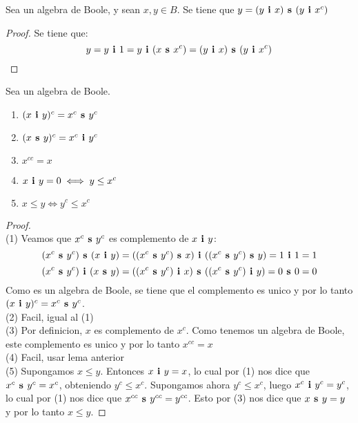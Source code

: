 \begin{lemma}
  Sea \algBoole un algebra de Boole, y sean $x, y \in B$. Se tiene que $y = (y\textbf{ i }x)\textbf{ s }(y\textbf{ i }x^c)$
\end{lemma}
\begin{proof}
  Se tiene que:
  $$
  y = y\textbf{ i }1 = y\textbf{ i }(x\textbf{ s }x^c) = (y\textbf{ i }x)\textbf{ s }(y\textbf{ i }x^c)
  $$
\end{proof}

\begin{theorem}
  Sea \algBoole un algebra de Boole.
  \begin{enumerate}
    \item $(x\textbf{ i }y)^c = x^c\textbf{ s }y^c$
    \item $(x\textbf{ s }y)^c = x^c\textbf{ i }y^c$
    \item $x^{cc} = x$
    \item $x\textbf{ i }y = 0 \iff y \leq x^c$
    \item $x\leq y \iff y^c \leq x^c$
  \end{enumerate}
\end{theorem}
\begin{proof}
  $ $\\
  (1) Veamos que $x^c\textbf{ s }y^c$ es complemento de $x\textbf{ i }y$:
  $$
  (x^c\textbf{ s }y^c)\textbf{ s }(x\textbf{ i }y) = ((x^c\textbf{ s }y^c)\textbf{ s }x)\textbf{ i }((x^c\textbf{ s }y^c)\textbf{ s }y) = 1\textbf{ i }1 = 1
  $$
  $$
  (x^c\textbf{ s }y^c)\textbf{ i }(x\textbf{ s }y) = ((x^c\textbf{ s }y^c)\textbf{ i }x)\textbf{ s }((x^c\textbf{ s }y^c)\textbf{ i }y) = 0\textbf{ s }0 = 0
  $$
  Como es un algebra de Boole, se tiene que el complemento es unico y por lo tanto $(x\textbf{ i }y)^c = x^c\textbf{ s }y^c$.\\
  (2) Facil, igual al (1)\\
  (3) Por definicion, $x$ es complemento de $x^c$. Como tenemos un algebra de Boole, este complemento es unico y por lo tanto $x^{cc} = x$\\
  (4) Facil, usar lema anterior\\
  (5) Supongamos $x \leq y$. Entonces $x\textbf{ i }y = x$, lo cual por (1) nos dice que $x^c\textbf{ s }y^c = x^c$,
  obteniendo $y^c \leq x^c$. Supongamos ahora $y^c \leq x^c$, luego $x^c\textbf{ i }y^c = y^c$, lo cual por (1) nos dice que $x^{cc}\textbf{ s }y^{cc} = y^{cc}$.
  Esto por (3) nos dice que $x\textbf{ s }y = y$ y por lo tanto $x \leq y$.
\end{proof}

